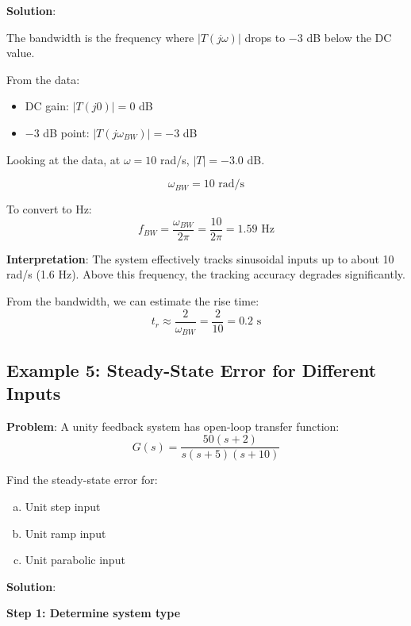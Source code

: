 \textbf{Solution}:

The bandwidth is the frequency where $|T(j\omega)|$ drops to $-3$ dB below the DC value.

From the data:
\begin{itemize}
    \item DC gain: $|T(j0)| = 0$ dB
    \item $-3$ dB point: $|T(j\omega_{BW})| = -3$ dB
\end{itemize}

Looking at the data, at $\omega = 10$ rad/s, $|T| = -3.0$ dB.

\begin{equation}
    \boxed{\omega_{BW} = 10 \text{ rad/s}}
\end{equation}

To convert to Hz:
\begin{equation}
    f_{BW} = \frac{\omega_{BW}}{2\pi} = \frac{10}{2\pi} = 1.59 \text{ Hz}
\end{equation}

\textbf{Interpretation}: The system effectively tracks sinusoidal inputs up to about 10 rad/s (1.6 Hz). Above this frequency, the tracking accuracy degrades significantly.

From the bandwidth, we can estimate the rise time:
\begin{equation}
    t_r \approx \frac{2}{\omega_{BW}} = \frac{2}{10} = 0.2 \text{ s}
\end{equation}

\subsection{Example 5: Steady-State Error for Different Inputs}

\textbf{Problem}: A unity feedback system has open-loop transfer function:
\begin{equation}
    G(s) = \frac{50(s+2)}{s(s+5)(s+10)}
\end{equation}

Find the steady-state error for:
\begin{enumerate}[(a)]
    \item Unit step input
    \item Unit ramp input
    \item Unit parabolic input
\end{enumerate}

\textbf{Solution}:

\textbf{Step 1: Determine system type}

